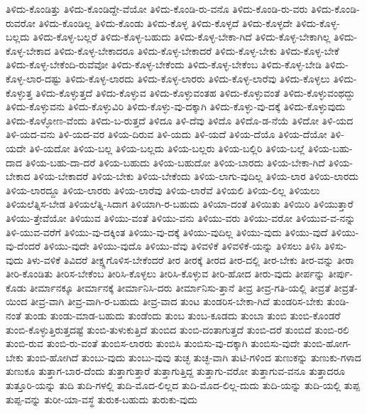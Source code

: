 {ತಿಳಿದು-ಕೊಂಡಿತ್ತು
ತಿಳಿದು-ಕೊಂಡಿದ್ದೇ-ವೆಯೋ
ತಿಳಿದು-ಕೊಂಡಿ-ರು-ವನೊ
ತಿಳಿದು-ಕೊಂಡಿ-ರು-ವರು
ತಿಳಿದು-ಕೊಂಡಿ-ರುವರೋ
ತಿಳಿದು-ಕೊಂಡಿಲ್ಲ
ತಿಳಿದು-ಕೊಂಡು
ತಿಳಿದು-ಕೊಳ್ಳ
ತಿಳಿದು-ಕೊಳ್ಳದೆ
ತಿಳಿದು-ಕೊಳ್ಳದೇ
ತಿಳಿದು-ಕೊಳ್ಳ-ಬಲ್ಲದು
ತಿಳಿದು-ಕೊಳ್ಳ-ಬಲ್ಲರೆ
ತಿಳಿದು-ಕೊಳ್ಳ-ಬಹುದು
ತಿಳಿದು-ಕೊಳ್ಳ-ಬೇಕಾ-ಗಿದೆ
ತಿಳಿದು-ಕೊಳ್ಳ-ಬೇಕಾಗಿಲ್ಲ
ತಿಳಿದು-ಕೊಳ್ಳ-ಬೇಕಾದ
ತಿಳಿದು-ಕೊಳ್ಳ-ಬೇಕಾದರೂ
ತಿಳಿದು-ಕೊಳ್ಳ-ಬೇಕಾದರೆ
ತಿಳಿದು-ಕೊಳ್ಳ-ಬೇಕು
ತಿಳಿದು-ಕೊಳ್ಳ-ಬೇಕೆ
ತಿಳಿದು-ಕೊಳ್ಳ-ಬೇಕೆಂದಿ-ರುವೆವೋ
ತಿಳಿದು-ಕೊಳ್ಳ-ಬೇಕೆಂದು
ತಿಳಿದು-ಕೊಳ್ಳ-ಬೇಕೆಂಬ
ತಿಳಿದು-ಕೊಳ್ಳ-ಬೇಡಿ
ತಿಳಿದು-ಕೊಳ್ಳ-ಲಾರ-ದಷ್ಟು
ತಿಳಿದು-ಕೊಳ್ಳ-ಲಾರದು
ತಿಳಿದು-ಕೊಳ್ಳ-ಲಾರರು
ತಿಳಿದು-ಕೊಳ್ಳ-ಲಾರೆವು
ತಿಳಿದು-ಕೊಳ್ಳಲು
ತಿಳಿದು-ಕೊಳ್ಳುತ್ತ
ತಿಳಿದು-ಕೊಳ್ಳುತ್ತದೆ
ತಿಳಿದು-ಕೊಳ್ಳುವ
ತಿಳಿದು-ಕೊಳ್ಳುವಂತಹ
ತಿಳಿದು-ಕೊಳ್ಳುವಂತೆ
ತಿಳಿದು-ಕೊಳ್ಳುವಂಥದ್ದು
ತಿಳಿದು-ಕೊಳ್ಳುವನು
ತಿಳಿದು-ಕೊಳ್ಳುವಿರಿ
ತಿಳಿದು-ಕೊಳ್ಳು-ವು-ದಕ್ಕಾಗಿ
ತಿಳಿದು-ಕೊಳ್ಳು-ವು-ದಕ್ಕೆ
ತಿಳಿದು-ಕೊಳ್ಳುವುದು
ತಿಳಿದು-ಕೊಳ್ಳೋಣ-ವೆಂದು
ತಿಳಿದು-ಬ-ರುತ್ತದೆ
ತಿಳಿದೂ
ತಿಳಿ-ದೆವು
ತಿಳಿದೊ
ತಿಳಿದೊ-ಡ-ನೆಯೆ
ತಿಳಿದೋ
ತಿಳಿ-ಯದ
ತಿಳಿ-ಯದ-ವನು
ತಿಳಿ-ಯದ-ವರ
ತಿಳಿಯ-ದಿರುವ
ತಿಳಿ-ಯದು
ತಿಳಿ-ಯದೆ
ತಿಳಿಯ-ದೆಯೊ
ತಿಳಿಯ-ದೆಯೋ
ತಿಳಿ-ಯದೇ
ತಿಳಿ-ಯದೋ
ತಿಳಿಯ-ಬಲ್ಲ
ತಿಳಿಯ-ಬಲ್ಲದು
ತಿಳಿಯ-ಬಲ್ಲರು
ತಿಳಿಯ-ಬಲ್ಲಿರಿ
ತಿಳಿಯ-ಬಲ್ಲೆ
ತಿಳಿಯ-ಬಹು-ದಾದ
ತಿಳಿಯ-ಬಹು-ದಾ-ದರೆ
ತಿಳಿಯ-ಬಹುದು
ತಿಳಿಯ-ಬಹುದೋ
ತಿಳಿಯ-ಬಾರದು
ತಿಳಿಯ-ಬೇಕಾ-ಗಿದೆ
ತಿಳಿಯ-ಬೇಕಾದ
ತಿಳಿಯ-ಬೇಕಾದರೆ
ತಿಳಿಯ-ಬೇಕು
ತಿಳಿಯ-ಬೇಕೆಂದು
ತಿಳಿಯ-ಲಾಗು-ವುದಿಲ್ಲ
ತಿಳಿಯ-ಲಾರ
ತಿಳಿಯ-ಲಾರದು
ತಿಳಿಯ-ಲಾರದ್ದೂ
ತಿಳಿಯ-ಲಾರರು
ತಿಳಿಯ-ಲಾರೆವು
ತಿಳಿಯ-ಲಾರೆವೆ
ತಿಳಿಯಲಿ
ತಿಳಿಯ-ಲಿಲ್ಲ
ತಿಳಿಯಲು
ತಿಳಿಯಲೆತ್ನಿಸ-ಬೇಡ
ತಿಳಿಯಲೆತ್ನಿ-ಸಿದಾಗ
ತಿಳಿಯಾಗಿ-ರ-ಬಹುದು
ತಿಳಿಯಾ-ದಂತೆ
ತಿಳಿಯಿತು
ತಿಳಿಯಿರಿ
ತಿಳಿಯುತ್ತಾರೆ
ತಿಳಿಯು-ತ್ತೇವೆಯೋ
ತಿಳಿಯುವ
ತಿಳಿಯು-ವಂತೆ
ತಿಳಿಯು-ವನು
ತಿಳಿಯು-ವರು
ತಿಳಿಯು-ವರೋ
ತಿಳಿಯುವ-ವ-ನನ್ನು
ತಿಳಿ-ಯುವ-ವರೆಗೆ
ತಿಳಿಯು-ವು-ದಕ್ಕಿಂತ
ತಿಳಿಯು-ವು-ದಕ್ಕೆ
ತಿಳಿಯು-ವುದಿಲ್ಲ
ತಿಳಿಯು-ವುದು
ತಿಳಿಯು-ವುದೆ
ತಿಳಿಯು-ವು-ದೆಂದರೆ
ತಿಳಿಯು-ವುದೇ
ತಿಳಿಯು-ವುದೊ
ತಿಳಿಯು-ವೆವು
ತಿಳಿವಳಿಕೆ
ತಿಳಿವಳಿಕೆ-ಯನ್ನು
ತಿಳಿಸಲು
ತಿಳಿಸಿ
ತಿಳಿಸು-ವುದು
ತಿಳು-ವಳಿಕೆ
ತಿವಿದರೆ
ತೀಕ್ಷ್ಣಗೊಳಿಸ-ಬೇಕೆಂದರೆ
ತೀರ
ತೀರಕ್ಕೆ
ತೀರದ
ತೀರ-ದಲ್ಲಿ
ತೀರ-ಬೇಕು
ತೀರ-ವನ್ನು
ತೀರಾ
ತೀರಿ-ಕೊಂಡಿತು
ತೀರಿಸ-ಬೇಕೆಂಬ
ತೀರಿಸಿ-ಕೊಳ್ಳಲು
ತೀರಿಸಿ-ಕೊಳ್ಳುವ
ತೀರಿ-ಹೋದ
ತೀರು-ವುದು
ತೀರ್ಪನ್ನು
ತೀರ್ಪು-ಕೊಡು
ತೀರ್ಮಾನಕ್ಕೂ
ತೀರ್ಮಾನಕ್ಕೆ
ತೀರ್ಮಾನಿಸಿ-ದರು
ತೀರ್ಮಾನಿಸು-ತ್ತಾನೆ
ತೀವ್ರ
ತೀವ್ರ-ಗತಿ-ಯಲ್ಲಿ
ತೀವ್ರತೆ
ತೀವ್ರತೆ-ಯಿಂದ
ತೀವ್ರ-ವಾಗಿ
ತೀವ್ರ-ವಾಗಿ-ರ-ಬಹುದು
ತೀವ್ರ-ವಾದ
ತುಂಟ
ತುಂಡರಿಸ-ಬೇಕಾ-ಗಿದೆ
ತುಂಡರಿಸ-ಬೇಕು
ತುಂಡಿ-ನಂತೆ
ತುಂಡು
ತುಂಡು-ಮಾಡ-ಬಹುದು
ತುಂಡೆಂದು
ತುಂಬ
ತುಂಬ-ಕೂಡದು
ತುಂಬಾ
ತುಂಬಿ
ತುಂಬಿ-ಕೊಂಡರೆ
ತುಂಬಿ-ಕೊಳ್ಳುತ್ತಿರುತ್ತದಷ್ಟೆ
ತುಂಬಿ-ತುಳುಕುತ್ತಿದೆ
ತುಂಬಿದ
ತುಂಬಿ-ದಂತಾಗುತ್ತದೆ
ತುಂಬಿ-ದರೆ
ತುಂಬಿದೆ
ತುಂಬಿ-ರಲಿ
ತುಂಬಿ-ರುವ
ತುಂಬಿ-ರು-ವಂತೆ
ತುಂಬಿಸ-ಲಾರರು
ತುಂಬಿಸಿ
ತುಂಬಿಸು-ವು-ದಕ್ಕಾಗಿ
ತುಂಬಿಸು-ವುದೇ
ತುಂಬಿ-ಹೋಗ-ಬೇಕು
ತುಂಬಿ-ಹೋಗಿದೆ
ತುಂಬು-ವುದು
ತುಂಬು-ವುವು
ತುಚ್ಛ
ತುಚ್ಛ-ವಾಗಿ
ತುಟಿ-ಗಳಿಂದ
ತುಣುಕನ್ನು
ತುಣುಕು-ಗಳಾದ
ತುಣುಕೂ
ತುತ್ತಾಗ-ಬಾರ-ದೆಂದು
ತುತ್ತಾಗುತ್ತಾರೆ
ತುತ್ತಾಗುತ್ತಿದ್ದ
ತುತ್ತಾಗು-ವರೋ
ತುತ್ತಾಗುವ-ವನೂ
ತುತ್ತಾದರೂ
ತುತ್ತೂರಿ-ಯನ್ನು
ತುದಿ
ತುದಿ-ಗಳಲ್ಲಿ
ತುದಿ-ಮೊದ-ಲಿಲ್ಲದ
ತುದಿ-ಮೊದ-ಲಿಲ್ಲ-ದುದು
ತುದಿ-ಯನ್ನು
ತುದಿ-ಯಲ್ಲಿ
ತುಪ್ಪ
ತುಪ್ಪ-ವನ್ನು
ತುರೀ-ಯಾ-ವಸ್ಥೆ
ತುರುಕ-ಬಹುದು
ತುರುಕು-ವುದು
}
